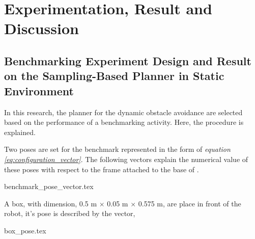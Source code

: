 
\chapter{Experimentation, Result and Discussion}\label{chap:experimentation_result_discussion}

\section{Benchmarking Experiment Design and Result on the Sampling-Based Planner in Static Environment}

In this research, the planner for the dynamic obstacle
avoidance are selected based on the performance of a benchmarking
activity. Here, the procedure is explained.

Two poses are set for the benchmark represented in the 
form of \textit{equation \ref{eq:configuration_vector}}. 
The following vectors explain the numerical
value of these poses with respect to the frame attached to the base
of \rimini.

{benchmark_pose_vector.tex}

A box, with dimension, 0.5 m $\times$ 0.05 m $\times$ 0.575 m, are place
in front of the robot, it's pose is described by the vector,

{box_pose.tex}

